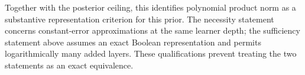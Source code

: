 Together with the posterior ceiling, this identifies polynomial product
norm as a substantive representation criterion for this prior. The
necessity statement concerns constant-error approximations at the same
learner depth; the sufficiency statement above assumes an exact Boolean
representation and permits logarithmically many added layers. These
qualifications prevent treating the two statements as an exact
equivalence.
